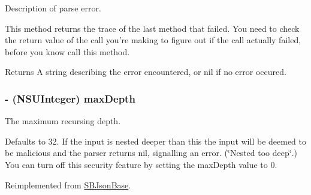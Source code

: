 \-Description of parse error. 

\-This method returns the trace of the last method that failed. \-You need to check the return value of the call you're making to figure out if the call actually failed, before you know call this method.

\begin{DoxyReturn}{\-Returns}
\-A string describing the error encountered, or nil if no error occured. 
\end{DoxyReturn}
\hypertarget{interface_s_b_json_parser_a0378b4ce99a1caeddc4a05da37ca4ffa}{
\subsubsection[{max\-Depth}]{\setlength{\rightskip}{0pt plus 5cm}-\/ (\-N\-S\-U\-Integer) max\-Depth}}
\label{interface_s_b_json_parser_a0378b4ce99a1caeddc4a05da37ca4ffa}


\-The maximum recursing depth. 

\-Defaults to 32. \-If the input is nested deeper than this the input will be deemed to be malicious and the parser returns nil, signalling an error. (\char`\"{}\-Nested too deep\char`\"{}.) \-You can turn off this security feature by setting the max\-Depth value to 0. 

\-Reimplemented from \hyperlink{interface_s_b_json_base_abe3e47517711570a9a57e2d92a15055b}{\-S\-B\-Json\-Base}.



